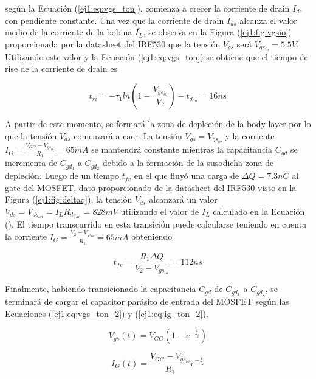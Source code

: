 según la Ecuación (\ref{ej1:eq:vgs_ton}), comienza a crecer la corriente de drain $I_{ds}$ con pendiente constante. Una vez que la corriente de drain $I_{ds}$ alcanza el valor medio de la corriente de la bobina $\bar{I_L}$, se observa en la Figura (\ref{ej1:fig:vgsio}) proporcionada por la datasheet del IRF530 que la tensión $V_{gs}$ será $V_{gs_{io}} = 5.5V$. Utilizando este valor y la Ecuación (\ref{ej1:eq:vgs_ton}) se obtiene que el tiempo de rise de la corriente de drain es

\begin{equation}
	t_{ri} = -\tau_1 ln\left( 1-\frac{V_{gs_{io}}}{V_2} \right) -t_{d_{on}} = 16ns
\label{ej1:eq:trise}
\end{equation}

A partir de este momento, se formará la zona de depleción de la body layer por lo que la tensión $V_{ds}$ comenzará a caer. La tensión $V_{gs} = V_{gs_{io}}$ y la corriente $I_G = \frac{V_{GG}-V_{gs_{io}}}{R_1} = 65mA$ se mantendrá constante mientras la capacitancia $C_{gd}$ se incrementa de $C_{gd_1}$ a $C_{gd_2}$ debido a la formación de la susodicha zona de depleción. Luego de un tiempo $t_{fv}$ en el que fluyó una carga de $\Delta Q = 7.3nC$ al gate del MOSFET, dato proporcionado de la datasheet del IRF530 visto en la Figura (\ref{ej1:fig:deltaq}), la tensión $V_{ds}$ alcanzará un valor $V_{ds} = V_{ds_{on}} = \bar{I_L} R_{ds_{on}} = 828mV$ utilizando el valor de $\bar{I_L}$ calculado en la Ecuación (). El tiempo transcurrido en esta transición puede calcularse teniendo en cuenta la corriente $I_G = \frac{V_2 - V_{gs_{io}}}{R_1}= 65mA$ obteniendo

\begin{equation}
	t_{fv} = \frac{R_1 \Delta Q}{V_2 - V_{gs_{io}}} = 112ns
	\label{ej1:eq:tfv}
\end{equation}

Finalmente, habiendo transicionado la capacitancia $C_{gd}$ de $C_{gd_1}$ a $C_{gd_2}$, se terminará de cargar el capacitor parásito de entrada del MOSFET según las Ecuaciones (\ref{ej1:eq:vgs_ton_2}) y (\ref{ej1:eq:ig_ton_2}).

\begin{equation}
V_{gs}(t) = V_{GG}(1-e^{-\frac{t}{\tau_2}})
\label{ej1:eq:vgs_ton_2}
\end{equation}

\begin{equation}
I_{G}(t) =  \frac{V_{GG}-V_{gs_{io}}}{R_1}e^{-\frac{t}{\tau_2}}
\label{ej1:eq:ig_ton_2}
\end{equation}

